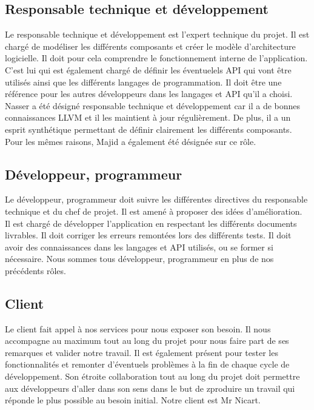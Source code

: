 \documentclass{../res/univ-projet}
\begin{document}
  \subsection{Responsable technique et développement}
    Le responsable technique et développement est l’expert technique du projet. Il est chargé de modéliser les différents composants et créer le modèle d’architecture logicielle. Il doit pour cela comprendre le fonctionnement interne de l’application. C’est lui qui est également chargé de définir les éventuelels API qui vont être utilisés ainsi que les différents langages de programmation. Il doit être une référence pour les autres développeurs dans les langages et API qu’il a choisi. Nasser a été désigné responsable technique et développement car il a de bonnes connaissances LLVM et il les maintient à jour régulièrement. De plus, il a un esprit synthétique permettant de définir clairement les différents composants. Pour les mêmes raisons, Majid a également été désignée sur ce rôle.
  \subsection{Développeur, programmeur}
    Le développeur, programmeur doit suivre les différentes directives du responsable technique et du chef de projet. Il est amené à proposer des idées d’amélioration. Il est chargé de développer l’application en respectant les différents documents livrables. Il doit corriger les erreurs remontées lors des différents tests. Il doit avoir des connaissances dans les langages et API utilisés, ou se former si nécessaire. Nous sommes tous développeur, programmeur en plus de nos précédents rôles. 
  \subsection{Client}
    Le client fait appel à nos services pour nous exposer son besoin. Il nous accompagne au maximum tout au long du projet pour nous faire part de ses remarques et valider notre travail. Il est également présent pour tester les fonctionnalités et remonter d’éventuels problèmes à la fin de chaque cycle de développement. Son étroite collaboration tout au long du projet doit permettre aux développeurs d’aller dans son sens dans le but de zproduire un travail qui réponde le plus possible au besoin initial.
      Notre client est Mr Nicart.
\end{document}
